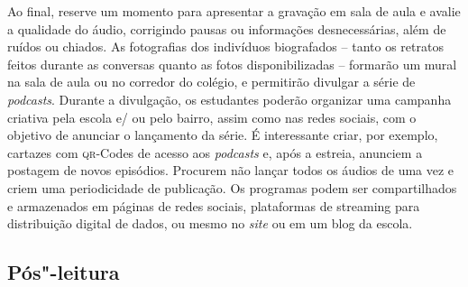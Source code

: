 \documentclass[12pt]{extarticle}
\begin{document}
Ao final, reserve um momento para apresentar a gravação em sala de aula
e avalie a qualidade do áudio, corrigindo pausas ou informações
desnecessárias, além de ruídos ou chiados. As fotografias dos indivíduos
biografados -- tanto os retratos feitos durante as conversas quanto as
fotos disponibilizadas -- formarão um mural na sala de aula ou no
corredor do colégio, e permitirão divulgar a série de \emph{podcasts}.
Durante a divulgação, os estudantes poderão organizar uma campanha
criativa pela escola e/ ou pelo bairro, assim como nas redes sociais,
com o objetivo de anunciar o lançamento da série. É interessante criar,
por exemplo, cartazes com \textsc{qr}-Codes de acesso aos \emph{podcasts} e, após
a estreia, anunciem a postagem de novos episódios. Procurem não lançar
todos os áudios de uma vez e criem uma periodicidade de publicação. Os
programas podem ser compartilhados e armazenados em páginas de redes
sociais, plataformas de streaming para distribuição digital de dados, ou
mesmo no \emph{site} ou em um blog da escola.

\subsection{Pós"-leitura}

\end{document}
